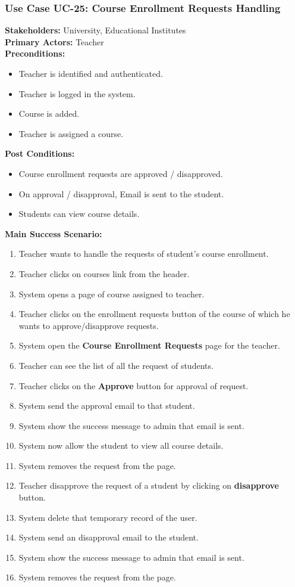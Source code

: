 \documentclass[12pt]{article}
\begin{document}
\subsubsection{Use Case UC-25: Course Enrollment Requests Handling}
\textbf{Stakeholders: } University, Educational Institutes \\
\textbf{Primary Actors: } Teacher \\
\textbf{Preconditions:}
\begin{itemize}
\item Teacher is identified and authenticated.
\item Teacher is logged in the system.
\item Course is added.
\item Teacher is assigned a course.
\end{itemize}
\textbf{Post Conditions: }
\begin{itemize}
\item Course enrollment requests are approved / disapproved.
\item On approval / disapproval, Email is sent to the student.
\item Students can view course details.
\end{itemize}
\textbf{Main Success Scenario:}
\begin{enumerate}
\item Teacher wants to handle the requests of student's course enrollment.
\item Teacher clicks on courses link from the header.
\item System opens a page of course assigned to teacher.
\item Teacher clicks on the enrollment requests button of the course of which he wants to approve/disapprove requests.
\item System open the \textbf{Course Enrollment Requests} page for the teacher.
\item Teacher can see the list of all the request of students.
\item Teacher clicks on the \textbf{Approve} button for approval of request.
\item System send the approval email to that student.
\item System show the success message to admin that email is sent.
\item System now allow the student to view all course details.
\item System removes the request from the page.
\item Teacher disapprove the request of a student by clicking on \textbf{disapprove} button.
\item System delete that temporary record of the user.
\item System send an disapproval email to the student.
\item System show the success message to admin that email is sent.
\item System removes the request from the page.
\end{enumerate}
\end{document}
